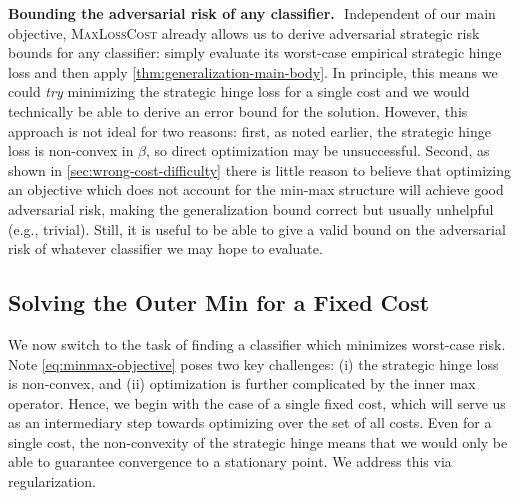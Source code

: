 \documentclass{article}
\theoremstyle{definition}
\renewcommand{\paragraph}[1]{{\textbf{#1}\,\,}}
\begin{document}
\paragraph{Bounding the adversarial risk of any classifier.}
Independent of our main objective, \textsc{MaxLossCost} already allows us to derive adversarial strategic risk bounds for any classifier:
simply evaluate its worst-case empirical strategic hinge loss and then apply \cref{thm:generalization-main-body}. In principle, this means we could \emph{try} minimizing the strategic hinge loss for a single cost and we would technically be able to derive an error bound for the solution. However, this approach is not ideal for two reasons: first, as noted earlier, the strategic hinge loss is non-convex in $\beta$, so direct optimization may be unsuccessful. Second, as shown in \cref{sec:wrong-cost-difficulty} there is little reason to believe that optimizing an objective which does not account for the min-max structure will achieve good adversarial risk, making the generalization bound correct but usually unhelpful (e.g., trivial). Still, it is useful to be able to give a valid bound on the adversarial risk of whatever classifier we may hope to evaluate.


\subsection{Solving the Outer Min for a Fixed Cost}
\label{sec:min-classifier_max-cost}

We now switch to the task of finding a classifier which minimizes worst-case risk.
Note \cref{eq:minmax-objective} poses two key challenges:
(i) the strategic hinge loss is non-convex,
and (ii) optimization is further complicated by the inner max operator.
Hence, we begin with the case of a single fixed cost,
which will serve us as an intermediary step towards optimizing over
the set of all costs.
Even for a single cost, the non-convexity of the strategic hinge means that we would only be able to guarantee convergence to a stationary point.
We address this via regularization.
\end{document}
